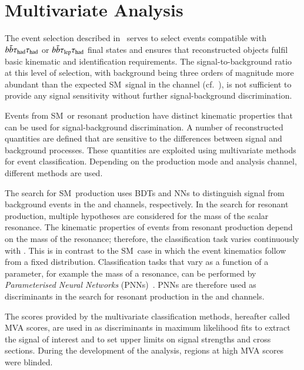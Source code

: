 \section{Multivariate Analysis}%
\label{sec:multivariate_analysis}

The event selection described in~ serves
to select events compatible with $b\bar{b}\tau_{\text{had}}\tau_{\text{had}}$ or $b\bar{b}\tau_{\text{lep}}\tau_{\text{had}}$ final states
and ensures that reconstructed objects fulfil basic kinematic and identification
requirements. The signal-to-background ratio at this level of selection, with
background being three orders of magnitude more abundant than the expected
SM~\HH signal in the \hadhad channel (cf.~), is
not sufficient to provide any signal sensitivity without further
signal-background discrimination.

Events from SM~\HH or resonant \HH production have distinct kinematic properties
that can be used for signal-background discrimination. A number of reconstructed
quantities are defined that are sensitive to the differences between signal and
background processes. These quantities are exploited using multivariate methods
for event classification. Depending on the \HH production mode and analysis
channel, different methods are used.

The search for SM~\HH production uses BDTs and NNs to distinguish signal from
background events in the \hadhad and \lephad channels, respectively. In the
search for resonant \HH production, multiple hypotheses are considered for the
mass of the scalar resonance. The kinematic properties of events from resonant
\HH production depend on the mass of the resonance; therefore, the
classification task varies continuously with \mX. This is in contrast to the
SM~\HH case in which the event kinematics follow from a fixed
distribution. Classification tasks that vary as a function of a parameter, for
example the mass of a resonance, can be performed by \emph{Parameterised Neural
  Networks} (PNNs)~\cite{Baldi:2016fzo}. PNNs are therefore used as
discriminants in the search for resonant \HH production in the \hadhad and
\lephad channels.

The scores provided by the multivariate classification methods, hereafter called
MVA scores, are used in  as discriminants in
maximum likelihood fits to extract the signal of interest and to set upper
limits on signal strengths and cross sections.
During the development of the analysis, regions at high MVA scores were blinded.

